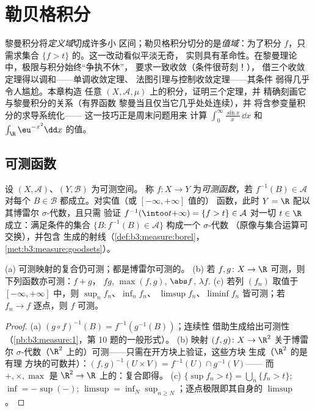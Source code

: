 \chapter{勒贝格积分}\label{ch:b3:lebesgue}

黎曼积分将\emph{定义域}切成许多小
区间；勒贝格积分切分的是\emph{值域}：为了积分
$f$，只需求集合 $\{f > t\}$ 的。这一改动看似平淡无奇，
实则具有革命性。在黎曼理论中，极限与积分始终“争执不休”，
要求一致收敛（条件很苛刻！），
借三个收敛定理得以调和——单调收敛定理、
法图引理与控制收敛定理——其条件
弱得几乎令人尴尬。本章构造
任意 $(X, \mathcal A,
\mu)$ 上的积分，证明三个定理，并
精确刻画它与黎曼积分的关系（有界函数
黎曼当且仅当它几乎处处连续），并
将含参变量积分的求导系统化——
这一技巧正是周末问题用来
计算 $\int_0^\infty\frac{\sin x}x\,\dd x$ 和
$\int_\R \eu^{-x^2}\dd x$ 的值。

\section{可测函数}

\begin{definition}\label{def:b3:lebesgue:measurable}
设 $(X, \mathcal A)$、$(Y, \mathcal B)$ 为可测空间。
称 $f \colon X \to Y$ 为\emph{可测函数}，若 $f^{-1}(B) \in \mathcal A$ 对每个 $B \in
\mathcal B$ 都成立。对实值（或 $[-\infty,+\infty]$ 值的）
函数，此时 $Y = \R$ 配以其博雷尔 $\sigma$-代数，且只需
验证 $f^{-1}(\intoo t{+\infty}) = \{f > t\} \in
\mathcal A$ 对一切 $t \in \R$ 成立：满足条件的集合 $\{B :
f^{-1}(B) \in \mathcal A\}$ 构成一个 $\sigma$-代数
（原像与集合运算可交换），并包含
生成的射线（\cref{def:b3:measure:borel}，
\cref{met:b3:measure:goodsets}）。
\end{definition}

\begin{proposition}\label{prop:b3:lebesgue:stability}
(a) 可测映射的复合仍可测；都是博雷尔可测的。
(b) 若 $f, g \colon X \to \R$ 可测，则下列函数亦可测：$f + g$，
$fg$, $\max(f,g)$, $\abs f$, $\lambda f$.
(c) 若列 $(f_n)$ 取值于
$[-\infty, +\infty]$ 中，则 $\sup_nf_n$、$\inf_nf_n$、
$\limsup f_n$、$\liminf f_n$ 皆可测；若 $f_n \to f$
逐点，则 $f$ 可测。
\end{proposition}

\begin{proof}
(a) $(g\circ f)^{-1}(B) = f^{-1}(g^{-1}(B))$；连续性
借助生成给出可测性
（\cref{pb:b3:measure:1}，第 10 题的一般形式）。
(b) 映射 $(f, g) \colon X \to \R^2$ 关于博雷尔
$\sigma$-代数（$\R^2$ 上的）可测——只需在开方块上验证，这些方块
生成（$\R^2$ 的是有理
方块的可数并）：$(f,g)^{-1}(U\times V) = f^{-1}(U)\cap g^{-1}(V)$——
而 $+, \times, \max$ 是 $\R^2 \to \R$ 上的：复合即得。
(c) $\{\sup f_n > t\} = \bigcup_n\{f_n > t\}$; $\inf = -\sup(-)$;
$\limsup = \inf_N\sup_{n \geq N}$；逐点极限即其自身的
$\limsup$。
\end{proof}

